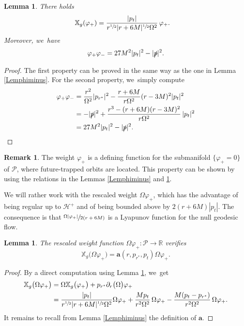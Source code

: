\documentclass[10pt]{amsart}
\theoremstyle{plain}
\newtheorem{lemma}[proposition]{Lemma}
\theoremstyle{definition}
\newtheorem{remark}[proposition]{Remark}
\newcommand\R{{\mathbb{R}}}
\newcommand\T{{\mathbb{X}}}
\begin{document}
\begin{lemma}\label{lemmavarphiplus}
There holds\vspace*{-3pt}
\begin{align*}
\T_g(\varphi_+)&= \frac{ |p_t|}{r^{\sfrac{1}{2}}|r+6M|^{\sfrac{1}{2}} \Omega^2}\,\varphi_{+}.
\end{align*}
Moreover, we~have
\[
\varphi_+ \varphi_- = 27M^2|p_t|^2-|\slashed{p}|^2.
\]
\end{lemma}

\begin{proof}
The first property can be proved in the same way as the one in Lemma \ref{Lemphiminus}. For the second property, we~simply compute
\begin{align*}
\varphi_+ \varphi_- & = \frac{r^2 }{\Omega^2} |p_{r^*}|^2 -\frac{r+6M}{r\Omega^2}(r-3M)^2|p_t|^2\\
&=-|\slashed{p}|^2+\frac{r^3-(r+6M)(r-3M)^2}{r\Omega^2}\,|p_t|^2 \\
& =27M^2|p_t|^2-|\slashed{p}|^2.\qedhere
\end{align*}
\end{proof}

\begin{remark}
The weight $\varphi_+$ is a defining function for the submanifold $\{\varphi_+=0\}$ of $\mathcal{P}$, where future-trapped orbits are located. This property can be shown by using the relations in the Lemmas \ref{Lemphiminus} and \ref{lemmavarphiplus}.
\end{remark}

We will rather work with the rescaled weight $\Omega\varphi_+$, which has the advantage of being regular up to $\mathcal{H}^+$ and of being bounded above by $2(r+6M)|p_t|$. The consequence is that $\sfrac{\Omega|\varphi_+|}{2(r+6M)}$ is a Lyapunov function for the null geodesic flow.

\begin{lemma}\label{LemOmvarplus}
The rescaled weight function $\Omega \varphi_+ \colon \mathcal{P}\to \R$ verifies\vspace*{-3pt}
\[
\T_g \bigl(\Omega \varphi_+ \bigr)= \pmb{a}(r,p_{r^*},p_t)\Omega\varphi_+.
\]
\end{lemma}

\begin{proof}
By a direct computation using Lemma \ref{lemmavarphiplus}, we~get\vspace*{-3pt}
\begin{align*}
\T_g \bigl(\Omega \varphi_+ \bigr)&= \Omega \T_g \bigl(\varphi_+ \bigr)+p_{r^*} \partial_r \bigl(\Omega \bigr) \varphi_+ \\
& = \frac{ |p_t|}{r^{\sfrac{1}{2}}|r+6M|^{\sfrac{1}{2}} \Omega^2} \Omega\varphi_{+}+\frac{Mp_t}{r^2 \Omega^2}\, \Omega \varphi_+ -\frac{M(p_t-p_{r^*})}{r^2 \Omega^2}\, \Omega \varphi_+.
\end{align*}
It remains to recall from Lemma \ref{Lemphiminus} the definition of $\pmb{a}$.
\end{proof}
\end{document}
